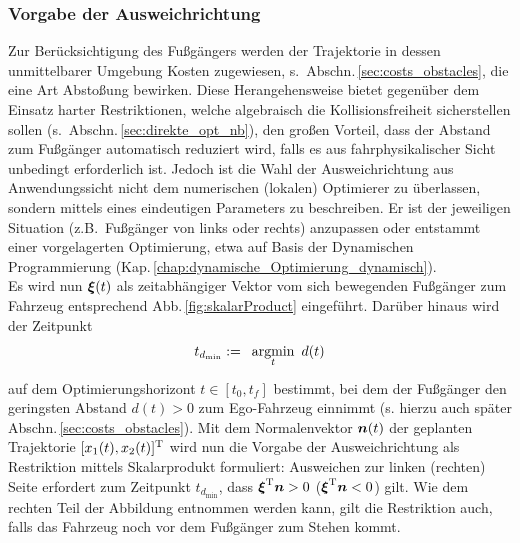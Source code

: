 \subsubsection{Vorgabe der Ausweichrichtung}
Zur Berücksichtigung des Fußgängers werden der Trajektorie in dessen unmittelbarer Umgebung Kosten zugewiesen, s.\ Abschn.\,\ref{sec:costs_obstacles}, die eine Art Abstoßung bewirken. Diese Herangehensweise bietet gegenüber dem Einsatz harter Restriktionen, welche algebraisch die Kollisionsfreiheit sicherstellen sollen (s.\ Abschn.\,\ref{sec:direkte_opt_nb}), den großen Vorteil, dass der Abstand zum Fußgänger automatisch reduziert wird, falls es aus fahrphysikalischer Sicht unbedingt erforderlich ist. Jedoch ist die Wahl der Ausweichrichtung aus Anwendungssicht nicht dem numerischen (lokalen) Optimierer zu überlassen, sondern mittels eines eindeutigen Parameters zu beschreiben. Er ist der jeweiligen Situation (z.B.\ Fußgänger von links oder rechts) anzupassen oder entstammt einer vorgelagerten Optimierung, etwa auf Basis der Dynamischen Programmierung (Kap.\,\ref{chap:dynamische_Optimierung_dynamisch}). \\
Es wird nun $\boldsymbol{\xi}(t)$ als zeitabhängiger Vektor vom sich bewegenden Fußgänger zum Fahrzeug entsprechend Abb.\,\ref{fig:skalarProduct} eingeführt. Darüber hinaus wird der Zeitpunkt
%
%
\begin{align*}
t_{d_{\min}} := \argmin{t} d(t)
\end{align*} 
auf dem Optimierungshorizont $t \in [t_0, t_f]$ bestimmt, bei dem der Fußgänger den geringsten Abstand  $d(t)>0$ zum Ego-Fahrzeug einnimmt (s. hierzu auch später Abschn.\,\ref{sec:costs_obstacles}).
Mit dem Normalenvektor $\boldsymbol{n}(t)$ der geplanten Trajektorie $[x_1(t), x_2(t)]^{{\rm T}}$ wird nun die Vorgabe der Ausweichrichtung als Restriktion mittels Skalarprodukt formuliert: Ausweichen zur linken (rechten) Seite erfordert zum Zeitpunkt $t_{d_{\min}}$, dass $\boldsymbol{\xi}^{{\rm T}}\boldsymbol{n}>0$ ($\boldsymbol{\xi}^{{\rm T}}\boldsymbol{n}<0$) gilt. Wie dem rechten Teil der Abbildung entnommen werden kann, gilt die Restriktion auch, falls das Fahrzeug noch vor dem Fußgänger zum Stehen kommt.\\
